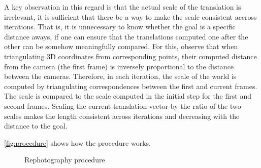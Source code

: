 A key observation in this regard is that the actual scale of the translation is
irrelevant, it is sufficient that there be a way to make the scale consistent
accross iterations. That is, it is unnecessary to know whether the goal is a
specific distance aways, if one can ensure that the translations computed one
after the other can be somehow meaningfully compared. For this, \citet{bae2010}
observe that when triangulating 3D coordinates from corresponding points, their
computed distance from the camera (the first frame) is inversely proportional
to the distance between the cameras. Therefore, in each iteration, the scale of
the world is computed by triangulating correspondences between the first and
current frames. The scale is compared to the scale computed in the initial step
for the first and second frames. Scaling the current translation vector by the
ratio of the two scales makes the length consistent across iterations and
decreasing with the distance to the goal.

\autoref{fig:procedure} shows how the procedure works.
\begin{figure}[h]
   {\centering      
      
      \caption{Rephotography procedure}
   \label{fig:procedure}}
\end{figure}
